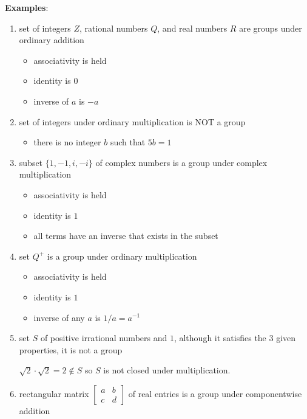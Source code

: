 \documentclass{article}
\begin{document}
  \textbf{Examples}:
  \begin{enumerate}
    \item set of integers $Z$, rational numbers $Q$, and real numbers $R$ are groups under ordinary addition
      \begin{itemize}
        \item associativity is held
        \item identity is $0$
        \item inverse of $a$ is $-a$
      \end{itemize}
    \item set of integers under ordinary multiplication is NOT a group
      \begin{itemize}
        \item there is no integer $b$ such that $5b = 1$
      \end{itemize}
    \item subset $\{1, -1, i , -i\}$ of complex numbers is a group under complex multiplication
      \begin{itemize}
        \item associativity is held
        \item identity is $1$
        \item all terms have an inverse that exists in the subset
      \end{itemize}
    \item set $Q^+$ is a group under ordinary multiplication
      \begin{itemize}
        \item associativity is held
        \item identity is $1$
        \item inverse of any $a$ is $1/a = a^{-1}$
      \end{itemize}
    \item set $S$ of positive irrational numbers and $1$, although it satisfies the 3 given properties, it is not a group
      \begin{itemize}
        $\sqrt{2} \cdot \sqrt{2} = 2 \notin S$ so $S$ is not closed under multiplication.
      \end{itemize}
    \item rectangular matrix $\begin{bmatrix} a & b \\ c & d \end{bmatrix}$ of real entries is a group under componentwise addition
      \begin{itemize}

\end{itemize}
\end{enumerate}
\end{document}
